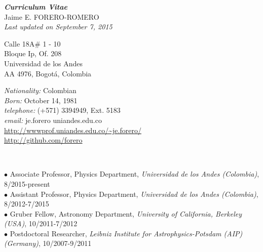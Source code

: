 \documentclass[10pt]{article}
\begin{document}
\noindent
\begin{center}
\emph{{\bf Curriculum Vitae}}\\
{{\Large\sc Jaime E. FORERO-ROMERO}}\\
\emph{Last updated on September 7, 2015}\\
\end{center}
\begin{minipage}{0.4\textwidth}
  \begin{flushleft}
    Calle 18A\# 1 - 10\\
    Bloque Ip, Of. 208\\
    Universidad de los Andes\\
    AA 4976, Bogot\'a, Colombia\\
  \end{flushleft}
\end{minipage}
\begin{minipage}{0.6\textwidth}
  \begin{flushright}
    {\it Nationality:} Colombian\\
    {\it Born:} October 14, 1981\\
    {\it telephone:} (+571) 3394949, Ext. 5183\\
    {\it email:} je.forero uniandes.edu.co\\    
    \url{http://wwwprof.uniandes.edu.co/~je.forero/}\\
    \url{http://github.com/forero}\\    
  \end{flushright}
\end{minipage}

\vspace{5mm}


\\
\noindent\makebox[\linewidth]{\rule{\textwidth}{0.4pt}}%

\noindent $\bullet$ Associate Professor, Physics Department, \emph{Universidad de los Andes (Colombia)}, 8/2015-present\\

\noindent $\bullet$ Assistant Professor, Physics Department, \emph{Universidad de los Andes (Colombia)}, 8/2012-7/2015\\

\noindent $\bullet$ Gruber Fellow, Astronomy Department, \emph{University of California, Berkeley (USA)}, 10/2011-7/2012\\

\noindent $\bullet$  Postdoctoral Researcher, \emph{Leibniz Institute for
  Astrophysics-Potsdam (AIP) (Germany)}, 10/2007-9/2011  \\  
\end{document}
